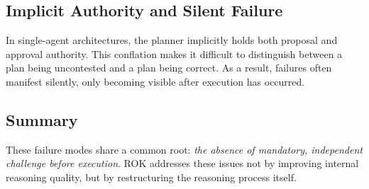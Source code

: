 \subsection{Implicit Authority and Silent Failure}
In single-agent architectures, the planner implicitly holds both proposal and approval authority. This conflation makes it difficult to distinguish between a plan being uncontested and a plan being correct. As a result, failures often manifest silently, only becoming visible after execution has occurred.

\subsection{Summary}
These failure modes share a common root: \emph{the absence of mandatory, independent challenge before execution}. ROK addresses these issues not by improving internal reasoning quality, but by restructuring the reasoning process itself.

